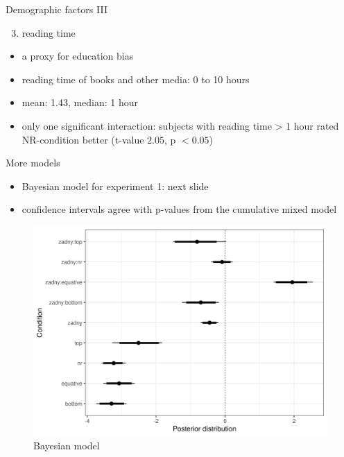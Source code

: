 \documentclass[
  ignorenonframetext,
]{beamer}
\providecommand{\tightlist}{%
  \setlength{\itemsep}{0pt}\setlength{\parskip}{0pt}}\usepackage{longtable,booktabs,array}
\begin{document}
\begin{frame}
\begin{block}{Demographic factors III}
\protect\hypertarget{demographic-factors-iii}{}
\begin{enumerate}
\setcounter{enumi}{2}
\tightlist
\item
  reading time
\end{enumerate}

\begin{itemize}
\tightlist
\item
  a proxy for education bias
\item
  reading time of books and other media: 0 to 10 hours
\item
  mean: 1.43, median: 1 hour
\item
  only one significant interaction: subjects with reading time
  \textgreater{} 1 hour rated NR-condition better (t-value \(2.05\), p
  \(< 0.05\))
\end{itemize}
\end{block}
\end{frame}

\begin{frame}
\begin{block}{More models}
\protect\hypertarget{more-models}{}
\begin{itemize}
\tightlist
\item
  Bayesian model for experiment 1: next slide
\item
  confidence intervals agree with p-values from the cumulative mixed
  model
\end{itemize}
\end{block}
\end{frame}

\begin{frame}
\begin{figure}

{\centering \includegraphics{"acc-results-complex.png"}

}

\caption{Bayesian model}

\end{figure}
\end{frame}
\end{document}
